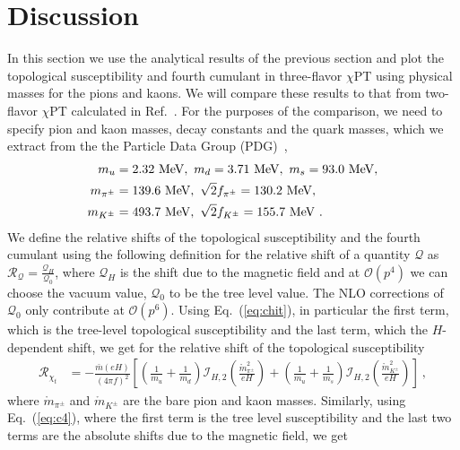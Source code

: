 \documentclass[12pt]{elsarticle}
\begin{document}
\section{Discussion}
\label{sec:discussion}
\noindent
In this section we use the analytical results of the previous section and plot the topological susceptibility and fourth cumulant in three-flavor $\chi$PT using physical masses for the pions and kaons. We will compare these results to that from two-flavor $\chi$PT calculated in Ref.~\cite{Adhikari:2021xra}. For the purposes of the comparison, we need to specify pion and kaon masses, decay constants and the quark masses, which we extract from the the Particle Data Group (PDG)~\cite{Zyla:2020zbs}, 
\begin{align}
\label{eq:quarkmasses}
m_{u}&=2.32\ {\rm MeV},\ m_{d}=3.71\ {\rm MeV},\ m_{s}=93.0\ {\rm MeV},\\
m_{\pi^{\pm}}&=139.6\ {\rm MeV},\ \sqrt{2}f_{\pi^{\pm}}=130.2\ {\rm MeV},\\ 
m_{K^{\pm}}&=493.7\ {\rm MeV},\ \sqrt{2}f_{K^{\pm}}=155.7\ {\rm MeV}\ .
\end{align}
We define the relative shifts of the topological susceptibility and the fourth cumulant using the following definition for the relative shift of a quantity $\mathcal{Q}$ as $\mathcal{R}_{\mathcal{Q}}=\frac{\mathcal{Q}_{H}}{\mathcal{Q}_{0}}$, where $\mathcal{Q}_{H}$ is the shift due to the magnetic field and at $\mathcal{O}(p^{4})$ we can choose the vacuum value, $\mathcal{Q}_{0}$ to be the tree level value. The NLO corrections of $\mathcal{Q}_{0}$ only contribute at $\mathcal{O}(p^{6})$. Using Eq.~(\ref{eq:chit}), in particular the first term, which is the tree-level topological susceptibility and the last term, which the $H$-dependent shift, we get for the relative shift of the topological susceptibility
\begin{equation}
\begin{split}
\label{eq:Rc4}
\mathcal{R}_{\chi_{t}}&=-\frac{\bar{m}(eH)}{(4\pi f)^{2}}\left[\left(\frac{1}{m_{u}}+\frac{1}{m_{d}}\right) \mathcal{I}_{H,2}(\tfrac{\mathring{m}_{\pi^{\pm}}^{2}}{eH})+\left(\frac{1}{m_{u}}+\frac{1}{m_{s}}\right)\mathcal{I}_{H,2}(\tfrac{\mathring{m}_{K^{\pm}}^{2}}{eH})\right]\ ,
\end{split}
\end{equation}
where $\mathring{m}_{\pi^{\pm}}$ and $\mathring{m}_{K^{\pm}}$ are the bare pion and kaon masses. Similarly, using Eq.~(\ref{eq:c4}), where the first term is the tree level susceptibility and the last two terms are the absolute shifts due to the magnetic field, we get
\end{document}

